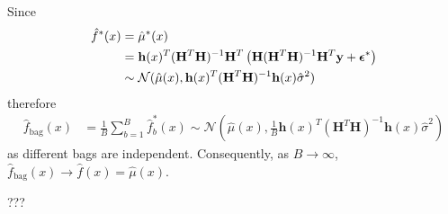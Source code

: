 \begin{exercise}
  Since
  \begin{align}
    \hat{f}^*(x) &= \hat{\mu}^*(x) \notag\\
    &= \mathbf{h}(x)^T(\mathbf{H}^T\mathbf{H})^{-1}\mathbf{H}^T
    \left(\mathbf{H}(\mathbf{H}^T\mathbf{H})^{-1}\mathbf{H}^T\mathbf{y} +
    \bm{\epsilon}^* \right) \notag\\
    & \sim \mathcal{N}(\hat{\mu}(x),
    \mathbf{h}(x)^T(\mathbf{H}^T\mathbf{H})^{-1}\mathbf{h}(x)\hat{\sigma}^2)
  \end{align}
  therefore
  \begin{align}
    \hat{f}_{\mbox{bag}}(x) &= \frac{1}{B}\sum_{b=1}^B
    \hat{f}_b^*(x) \sim \mathcal{N}(\hat{\mu}(x),
    \frac{1}{B}
    \mathbf{h}(x)^T(\mathbf{H}^T\mathbf{H})^{-1}\mathbf{h}(x)\hat{\sigma}^2)
  \end{align}
  as different bags are independent. Consequently, as
  $B\rightarrow\infty$, $\hat{f}_{\mbox{bag}}(x) \rightarrow
  \hat{f}(x) = \hat{\mu}(x)$.
\end{exercise}

\begin{exercise}
\end{exercise}

\begin{exercise}[(Program)]
\end{exercise}

\begin{exercise}
  ???
\end{exercise}